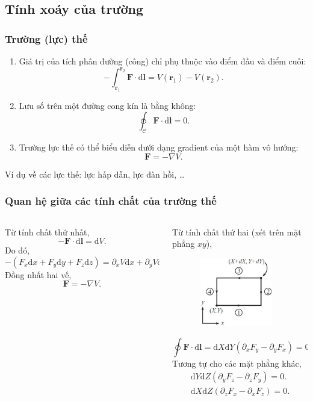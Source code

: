 \subsection{Tính xoáy của trường}
\begin{frame}
    \frametitle{Trường (lực) thế}
    \begin{enumerate}
        \item Giá trị của tích phân đường (công) chỉ phụ thuộc vào điểm đầu và điểm cuối: \[-\int_{\mathbf{r}_1}^{\mathbf{r}_2}\mathbf{F}\cdot\text{d}\mathbf{l}=V(\mathbf{r}_1)-V(\mathbf{r}_2).\]
        \item Lưu số trên một đường cong kín là bằng không: \[\oint_{\mathcal{C}}\mathbf{F}\cdot\text{d}\mathbf{l}=0.\]
        \item Trường lực thế có thể biểu diễn dưới dạng gradient của một hàm vô hướng: \[\mathbf{F}=-\nabla V.\]
    \end{enumerate}
    \vspace{-5pt}

    Ví dụ về các lực thế: lực hấp dẫn, lực đàn hồi, \dots
\end{frame}
\begin{frame}
    \frametitle{Quan hệ giữa các tính chất của trường thế}
    \begin{columns}
        \begin{column}{0.5\textwidth}
            \scriptsize
            Từ tính chất thứ nhất,
            \[-\mathbf{F}\cdot\text{d}\mathbf{l}=\text{d}V.\]
            Do đó,
            \[-(F_x \text{d}x +F_y \text{d}y +F_z \text{d}z)=\partial_x V\text{d}x +\partial_y V\text{d}y +\partial_z V\text{d}z.\]
            Đồng nhất hai vế, 
            \[\mathbf{F}=-\nabla V.\]
        \end{column}
        \begin{column}{0.5\textwidth}
            \scriptsize
            Từ tính chất thứ hai (xét trên mặt phẳng \(xy\)),
            \begin{figure}
                \centering
                \includegraphics[width=3.5cm, height=3cm]{Content/Figure/Curl.jpg}
            \end{figure}
            \[\oint \mathbf{F}\cdot \text{d}\mathbf{l}=\text{d}X\text{d}Y\left(\partial_x F_y -\partial_y F_x\right)=0.\]
            Tương tự cho các mặt phẳng khác,
            \vspace{-5pt}
            \begin{align*}
                &\text{d}Y\text{d}Z\left(\partial_y F_z -\partial_z F_y\right)=0.&\\
                &\text{d}X\text{d}Z\left(\partial_z F_x -\partial_x F_z\right)=0.&
            \end{align*}
        \end{column}
    \end{columns}
\end{frame}

